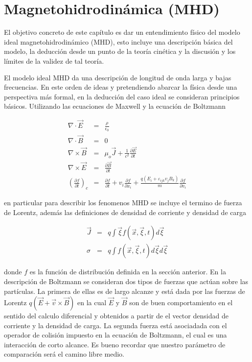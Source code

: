 \chapter{Magnetohidrodinámica (MHD)}


\noindent El objetivo concreto de este capítulo es dar un entendimiento físico del modelo ideal magnetohidrodinámico (MHD), esto incluye una descripción básica del modelo, la deducción desde un punto de la teoría cinética y la discusión y los límites de la validez de tal teoría.

\medskip

\noindent El modelo ideal MHD da una descripción de longitud de onda larga y bajas frecuencias. En este orden de ideas y pretendiendo abarcar la física desde una perspectiva más formal, en la deducción del caso ideal se consideran principios básicos. Utilizando las ecuaciones de Maxwell y la ecuación de Boltzmann



\begin{eqnarray}
\nabla \cdot \vec{E} &=& \frac{\rho}{\epsilon_{0}}\nonumber\\
\nabla \cdot \vec{B} &=& 0\nonumber\\
\nabla\times\vec{B} &=& \mu_{o}\vec{J}+\frac{1}{c^{2}}\frac{\partial \vec{E}}{\partial t}\nonumber\\
\nabla\times\vec{E} &=& \frac{\partial \vec{B}}{\partial t}\nonumber\\
\label{BMHD}
  \left(\frac{\partial f}{\partial t}\right)_{c} &=&\frac{\partial f}{\partial t} + v_{i}\frac{\partial f}{\partial x_{i}} + \frac{q(E_{i}+\varepsilon_{ijk}v_{j}B_{k})}{m}\frac{\partial f}{\partial v_{i}}
\end{eqnarray}

\noindent en particular para describir los fenomenos MHD se incluye el termino de fuerza de Lorentz, además las definiciones de densidad de corriente y densidad de carga 

\begin{eqnarray}
\vec{J} &=& q\int \vec{\xi}f(\vec{x},\vec{\xi},t)d\vec{\xi}\\
\sigma &=& q\int f(\vec{x},\vec{\xi},t)d\vec{\xi} d\vec{\xi}
\end{eqnarray}

\noindent donde $f$ es la función de distribución definida en la sección anterior. En la descripción de Boltzmann se consideran dos tipos de fuerzas que actúan sobre las partículas. La primera de ellas es de largo alcanze y está dada por las fuerzas de Lorentz $q(\vec{E}+\vec{v}\times\vec{B})$ en la cual $\vec{E}$ y $\vec{B}$ son de buen comportamiento en el sentido del calculo diferencial y obtenidos a partir de el vector densidad de corriente y la densidad de carga. La segunda fuerza está asociadada con el operador de colisión\cite{BGK} impuesto en la ecuación de Boltzmann, el cual es una interacción de corto alcance. Es bueno recordar que nuestro parámetro de comparación será el camino libre medio\cite{lecture5}. 

